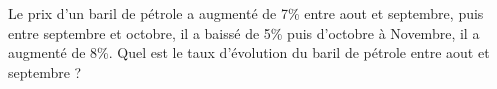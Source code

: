 
Le prix d'un baril de pétrole a augmenté de 7\% entre aout et septembre, puis entre septembre et octobre, il a baissé de 5\% puis d'octobre à Novembre, il a augmenté de 8\%. Quel est le taux d'évolution du baril de pétrole entre aout et septembre ?  